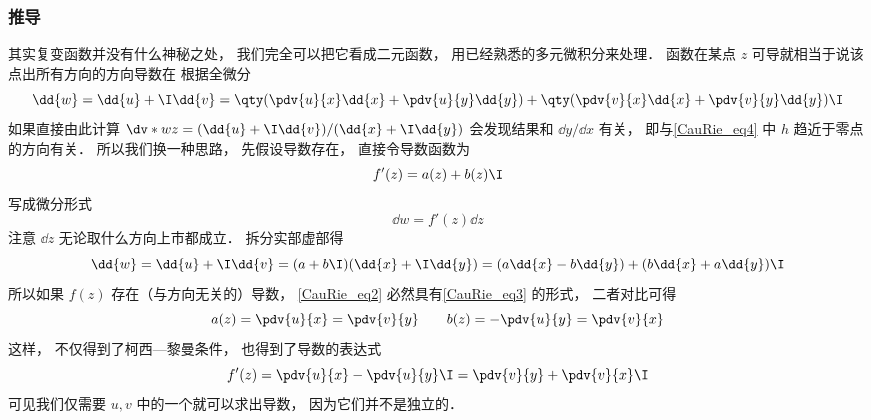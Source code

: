 \subsubsection{推导}
其实复变函数并没有什么神秘之处， 我们完全可以把它看成二元函数， 用已经熟悉的多元微积分来处理． 函数在某点 $z$ 可导就相当于说该点出所有方向的方向导数在 根据全微分
\begin{equation}\label{CauRie_eq2}
\dd{w} = \dd{u} + \I \dd{v} = \qty(\pdv{u}{x} \dd{x} + \pdv{u}{y} \dd{y}) + \qty(\pdv{v}{x} \dd{x} + \pdv{v}{y} \dd{y})\I
\end{equation}
如果直接由此计算 $\dv*{w}{z} = (\dd{u} + \I \dd{v})/(\dd{x} + \I \dd{y})$ 会发现结果和 $\dd{y}/\dd{x}$ 有关， 即与\autoref{CauRie_eq4} 中 $h$ 趋近于零点的方向有关． 所以我们换一种思路， 先假设导数存在， 直接令导数函数为
\begin{equation}
f'(z) = a(z) + b(z)\I
\end{equation}
写成微分形式
\begin{equation}
\dd{w} = f'(z)\dd{z}
\end{equation}
注意 $\dd z$ 无论取什么方向上市都成立． 拆分实部虚部得
\begin{equation}\label{CauRie_eq3}
\dd{w} = \dd{u} + \I \dd{v} = (a + b\I)(\dd{x} + \I\dd{y}) = (a \dd{x} - b\dd{y}) + (b \dd{x} + a\dd{y})\I
\end{equation}
所以如果 $f(z)$ 存在（与方向无关的）导数， \autoref{CauRie_eq2} 必然具有\autoref{CauRie_eq3} 的形式， 二者对比可得
\begin{equation}
a(z) = \pdv{u}{x} = \pdv{v}{y} \qquad
b(z) = -\pdv{u}{y} = \pdv{v}{x}
\end{equation}
这样， 不仅得到了柯西—黎曼条件， 也得到了导数的表达式
\begin{equation}
f'(z) = \pdv{u}{x} -\pdv{u}{y} \I = \pdv{v}{y} + \pdv{v}{x}\I
\end{equation}
可见我们仅需要 $u, v$ 中的一个就可以求出导数， 因为它们并不是独立的．

